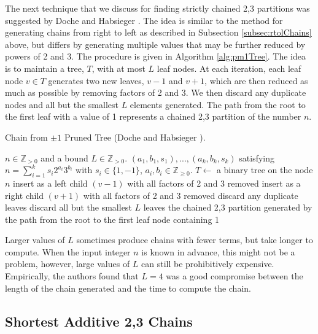 \documentclass{ucalgthes1}
\theoremstyle{definition}
\newcommand{\ZZgtz}{\mathbb{Z}_{>0}}
\newcommand{\ZZgez}{\mathbb{Z}_{\ge 0}}
\begin{document}
The next technique that we discuss for finding strictly chained 2,3 partitions was suggested by Doche and Habsieger \cite{Doche2008}. The idea is similar to the method for generating chains from right to left as described in Subsection \ref{subsec:rtolChains} above, but differs by generating multiple values that may be further reduced by powers of 2 and 3. The procedure is given in Algorithm \ref{alg:pm1Tree}.  The idea is to maintain a tree, $T$, with at most $L$ leaf nodes. At each iteration, each leaf node $v \in T$ generates two new leaves, $v-1$ and $v+1$, which are then reduced as much as possible by removing factors of 2 and 3.  We then discard any duplicate nodes and all but the smallest $L$ elements generated. The path from the root to the first leaf with a value of 1 represents a chained 2,3 partition of the number $n$.

\begin{algorithm}[htb]
\caption{Chain from $\pm 1$ Pruned Tree (Doche and Habsieger \cite{Doche2008}).}
\label{alg:pm1Tree}
\begin{algorithmic}[1]
\Require $n \in \ZZgtz$ and a bound $L \in \ZZgtz$.
\Ensure $(a_1, b_1, s_1), ..., (a_k, b_k, s_k)$ satisfying $n = \sum_{i=1}^k s_i 2^{a_i} 3^{b_i}$ with $s_i \in \{1, -1\}$, $a_i, b_i \in \ZZgez$.
\State $T \gets$ a binary tree on the node $n$
		\State insert as a left child $(v - 1)$ with all factors of 2 and 3 removed
		\State insert as a right child $(v + 1)$ with all factors of 2 and 3 removed
	\EndFor
	\State discard any duplicate leaves
	\State discard all but the smallest $L$ leaves
\EndWhile
\State \Return the chained 2,3 partition generated by the path from the root to the first leaf node containing 1
\end{algorithmic}
\end{algorithm}

Larger values of $L$ sometimes produce chains with fewer terms, but take longer to compute.  When the input integer $n$ is known in advance, this might not be a problem, however, large values of $L$ can still be prohibitively expensive.  Empirically, the authors found that $L=4$ was a good compromise between the length of the chain generated and the time to compute the chain. 


\subsection{Shortest Additive 2,3 Chains}
\label{subsec:shortAddChains}
\end{document}
